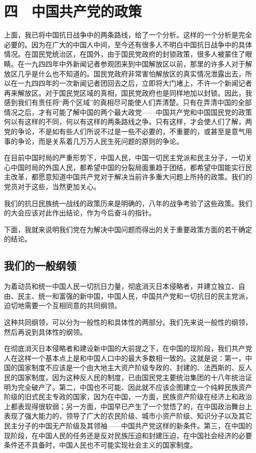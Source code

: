 \section{四　中国共产党的政策}

上面，我已将中国抗日战争中的两条路线，给了一个分析。这样的一个分析是完全必要的。因为在广大的中国人中间，至今还有很多人不明白中国抗日战争中的具体情况。在国民党统治区，在国外，由于国民党政府的封锁政策，很多人被蒙住了眼睛。在一九四四年中外新闻记者参观团来到中国解放区以前，那里的许多人对于解放区几乎是什么也不知道的。国民党政府非常害怕解放区的真实情况泄露出去，所以在一九四四年的一次新闻记者团回去之后，立即将大门堵上，不许一个新闻记者再来解放区。对于国民党区域的真相，国民党政府也是同样地加以封锁。因此，我感到我们有责任将“两个区域”的真相尽可能使人们弄清楚。只有在弄清中国的全部情况之后，才有可能了解中国的两个最大政党——中国共产党和中国国民党的政策何以有这样的不同，何以有这样的两条路线之争。只有这样，才会使人们了解，两党的争论，不是如有些人们所说不过是一些不必要的，不重要的，或甚至是意气用事的争论，而是关系着几万万人民生死问题的原则的争论。

在目前中国时局的严重形势下，中国人民，中国一切民主党派和民主分子，一切关心中国时局的外国人民，都希望中国的分裂局面重趋于团结，都希望中国能实行民主改革，都愿意知道中国共产党对于解决当前许多重大问题上所持的政策。我们的党员对于这些，当然更加关心。

我们的抗日民族统一战线的政策历来是明确的，八年的战争考验了这些政策。我们的大会应该对此作出结论，作为今后奋斗的指针。

下面，我就来说明我们党在为解决中国问题而得出的关于重要政策方面的若干确定的结论。

\subsection{我们的一般纲领}

为着动员和统一中国人民一切抗日力量，彻底消灭日本侵略者，并建立独立、自由、民主、统一和富强的新中国，中国人民，中国共产党和一切抗日的民主党派，迫切地需要一个互相同意的共同纲领。

这种共同纲领，可以分为一般性的和具体性的两部分。我们先来说一般性的纲领，然后再说到具体性的纲领。

在彻底消灭日本侵略者和建设新中国的大前提之下，在中国的现阶段，我们共产党人在这样一个基本点上是和中国人口中的最大多数相一致的。这就是说：第一，中国的国家制度不应该是一个由大地主大资产阶级专政的、封建的、法西斯的、反人民的国家制度，因为这种反人民的制度，已由国民党主要统治集团的十八年统治证明为完全破产了。第二，中国也不可能、因此就不应该企图建立一个纯粹民族资产阶级的旧式民主专政的国家，因为在中国，一方面，民族资产阶级在经济上和政治上都表现得很软弱；另一方面，中国早已产生了一个觉悟了的，在中国政治舞台上表现了强大能力的，领导了广大的农民阶级、城市小资产阶级、知识分子以及其它民主分子的中国无产阶级及其领袖——中国共产党这样的新条件。第三，在中国的现阶段，在中国人民的任务还是反对民族压迫和封建压迫，在中国社会经济的必要条件还不具备时，中国人民也不可能实现社会主义的国家制度。


